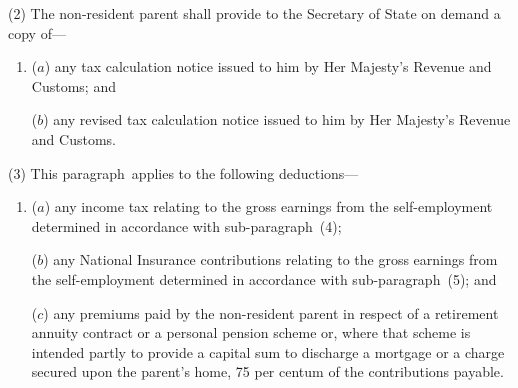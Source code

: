 \documentclass[12pt,a4paper]{article}
\begin{document}

(2) The non-resident parent shall provide to the Secretary of State on demand a copy of—
\begin{enumerate}\item[]
($a$) any tax calculation notice issued to him by Her Majesty’s Revenue and Customs; and

($b$) any revised tax calculation notice issued to him by Her Majesty’s Revenue and Customs.
\end{enumerate}

(3) This paragraph~applies to the following deductions—
\begin{enumerate}\item[]
($a$) any income tax relating to the gross earnings from the self-employment determined in accordance with sub-paragraph~(4);

($b$) any National Insurance contributions relating to the gross earnings from the self-employment determined in accordance with sub-paragraph~(5); and

($c$) any premiums paid by the non-resident parent in respect of a retirement annuity contract or a personal pension scheme or, where that scheme is intended partly to provide a capital sum to discharge a mortgage or a charge secured upon the parent’s home, 75 per centum of the contributions payable.
\end{enumerate}
\end{document}
